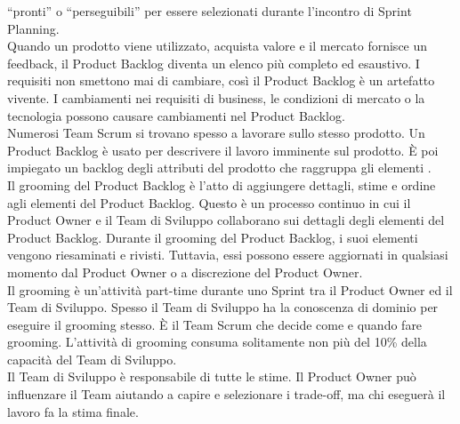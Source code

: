 ``pronti'' o ``perseguibili'' per essere selezionati durante l'incontro di Sprint Planning. \newline
\\Quando un prodotto viene utilizzato, acquista valore e il mercato fornisce un feedback, il Product Backlog diventa un elenco 
pi\`u completo ed  esaustivo. I requisiti non smettono mai di cambiare, cos\`i il Product Backlog \`e un artefatto vivente. I 
cambiamenti nei requisiti di business, le condizioni di mercato o la tecnologia possono causare cambiamenti nel Product 
Backlog. \newline
\\Numerosi Team Scrum si trovano spesso a lavorare sullo stesso prodotto. Un Product Backlog \`e usato per descrivere il lavoro 
imminente sul prodotto. \`E poi impiegato un backlog degli attributi del prodotto che raggruppa gli elementi .\newline
\\ Il grooming del Product Backlog \`e l'atto di aggiungere dettagli, stime e ordine agli elementi del Product Backlog. Questo 
\`e un processo continuo in cui il Product Owner e il Team di Sviluppo collaborano sui dettagli degli elementi del Product 
Backlog. Durante il grooming del Product Backlog, i suoi elementi vengono riesaminati e rivisti. Tuttavia, essi possono essere 
aggiornati in qualsiasi momento dal Product Owner o a discrezione del Product Owner. \newline
\\Il grooming \`e un'attivit\`a  part-time durante uno Sprint tra il Product Owner ed il Team di Sviluppo. Spesso il Team di 
Sviluppo ha la conoscenza di dominio per eseguire il grooming stesso. \`E il Team Scrum che decide come e quando fare grooming. 
L'attivit\`a di grooming consuma solitamente non pi\`u del 10\% della capacità del Team di Sviluppo. \newline
\\Il Team di Sviluppo \`e responsabile di tutte le stime. Il Product Owner pu\`o influenzare il Team aiutando a capire e 
selezionare i trade-off, ma chi eseguer\`a il lavoro fa la stima finale.

